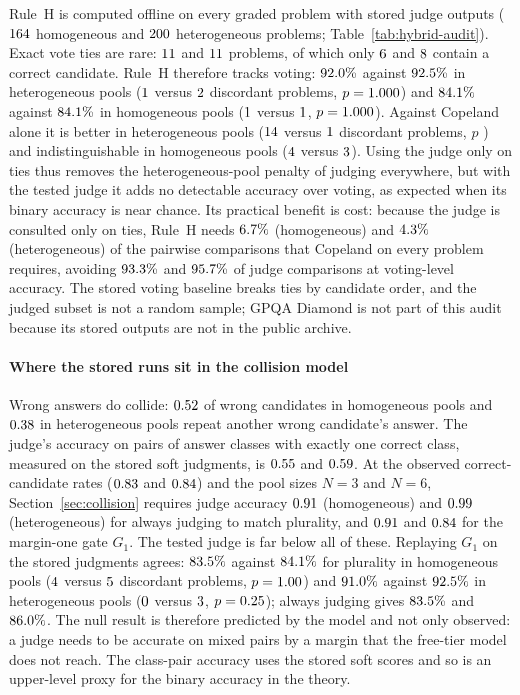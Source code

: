 \documentclass[preprint,11pt,number,sort&compress]{elsarticle}
\begin{document}
Rule~H is computed offline on every graded problem with stored judge outputs
($164$ homogeneous and $200$ heterogeneous problems; Table~\ref{tab:hybrid-audit}).
Exact vote ties are rare: $11$ and $11$ problems, of which only
$6$ and $8$ contain a correct candidate. Rule~H therefore tracks voting:
$92.0\%$ against $92.5\%$ in heterogeneous pools ($1$ versus $2$ discordant
problems, $p=1.000$) and $84.1\%$ against $84.1\%$ in homogeneous pools
($1$ versus $1$, $p=1.000$). Against Copeland alone it is better in heterogeneous
pools ($14$ versus $1$ discordant problems, $p$ \HybHetPCop) and indistinguishable
in homogeneous pools ($4$ versus $3$). Using the judge only on ties thus removes
the heterogeneous-pool penalty of judging everywhere, but with the tested judge it adds no
detectable accuracy over voting, as expected when its binary accuracy is near chance. Its practical
benefit is cost: because the judge is consulted only on ties, Rule~H needs $6.7\%$
(homogeneous) and $4.3\%$ (heterogeneous) of the pairwise comparisons that Copeland on
every problem requires, avoiding $93.3\%$ and $95.7\%$ of judge comparisons at
voting-level accuracy. The stored
voting baseline breaks ties by candidate order, and the judged subset is not a random sample;
GPQA Diamond is not part of this audit because its stored outputs are not in the public archive.

\paragraph{Where the stored runs sit in the collision model}
Wrong answers do collide: $0.52$ of wrong candidates in homogeneous pools and $0.38$ in
heterogeneous pools repeat another wrong candidate's answer. The judge's accuracy on pairs of
answer classes with exactly one correct class, measured on the stored soft judgments, is
$0.55$ and $0.59$. At the observed correct-candidate rates ($0.83$ and $0.84$) and the
pool sizes $N=3$ and $N=6$, Section~\ref{sec:collision} requires judge accuracy $0.91$
(homogeneous) and $0.99$ (heterogeneous) for always judging to match plurality, and
$0.91$ and $0.84$ for the margin-one gate $G_1$. The tested judge is far below all of these. Replaying
$G_1$ on the stored judgments agrees: $83.5\%$ against $84.1\%$ for plurality in homogeneous pools
($4$ versus $5$ discordant problems, $p=1.00$) and $91.0\%$ against $92.5\%$ in
heterogeneous pools ($0$ versus $3$, $p=0.25$); always judging gives $83.5\%$ and
$86.0\%$. The null result is therefore predicted by the model and
not only observed: a judge needs to be accurate on mixed pairs by a margin that the free-tier model does not
reach. The class-pair accuracy uses the stored soft scores and so is an upper-level proxy for the binary
accuracy in the theory.
\end{document}
